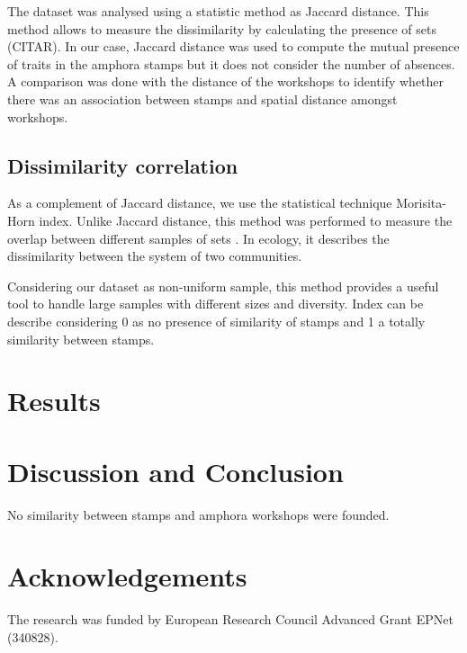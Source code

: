 \documentclass[review]{elsarticle}
\begin{document}
The dataset was analysed using a statistic method as Jaccard distance. This method allows to measure the dissimilarity by calculating the presence of sets (CITAR). In our case, Jaccard distance was used to compute the mutual presence of traits in the amphora stamps but it does not consider the number of absences. A comparison was done with the distance of the workshops to identify whether there was an association between stamps and spatial distance amongst workshops. 


\subsection{Dissimilarity correlation}

As a complement of Jaccard distance, we use the statistical technique Morisita-Horn index. Unlike Jaccard distance, this method was performed to measure the overlap between different samples of sets \citep{horn_measurement_1966}. In ecology, it describes the dissimilarity between the system of two communities. 

Considering our dataset as non-uniform sample, this method provides a useful tool to handle large samples with different sizes and diversity. Index can be describe considering 0 as no presence of similarity of stamps and 1 a totally similarity between stamps. 



\section{Results}

\section{Discussion and Conclusion}

No similarity between stamps and amphora workshops were founded. 

\section{Acknowledgements}

The research was funded by European Research Council Advanced Grant
EPNet (340828). 



\end{document}
